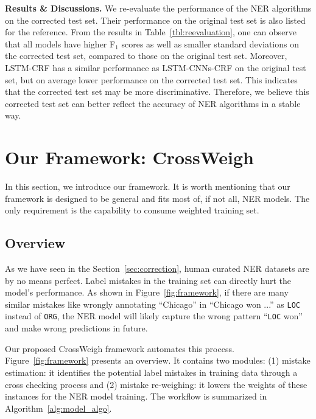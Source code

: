\documentclass[11pt,a4paper]{article}
\newcommand{\our}{\mbox{\sf CrossWeigh}\xspace}
\newcommand{\smallsection}[1]{{\noindent\textbf{#1.}}}
\begin{document}
%
         
        \smallsection{Results \& Discussions}
            We re-evaluate the performance of the NER algorithms on the corrected test set.
            Their performance on the original test set is also listed for the reference.
            From the results in Table~\ref{tbl:reevaluation}, one can observe that all models have higher F$_1$ scores as well as smaller standard deviations on the corrected test set, compared to those on the original test set.
            Moreover, LSTM-CRF has a similar performance as LSTM-CNNs-CRF on the original test set, but on average lower performance on the corrected test set. This indicates that the corrected test set may be more discriminative.
            Therefore, we believe this corrected test set can better reflect the accuracy of NER algorithms in a stable way.


            
%
 \section{Our Framework: CrossWeigh}\label{sec:crossweigh}
    In this section, we introduce our framework.
    It is worth mentioning that our framework is designed to be general and fits most of, if not all, NER models.
    The only requirement is the capability to consume weighted training set.
    
    \subsection{Overview}
    
        As we have seen in the Section~\ref{sec:correction}, human curated NER datasets are by no means perfect.
        Label mistakes in the training set can directly hurt the model's performance. 
        As shown in Figure~\ref{fig:framework}, if there are many similar mistakes like wrongly annotating ``Chicago'' in ``Chicago won ...'' as \texttt{LOC} instead of \texttt{ORG}, the NER model will likely capture the wrong pattern ``\texttt{LOC} won'' and make wrong predictions in future.
        


        Our proposed \our framework automates this process.
        Figure~\ref{fig:framework} presents an overview.
        It contains two modules: (1) mistake estimation: it identifies the potential label mistakes in training data through a cross checking process and (2) mistake re-weighing: it lowers the weights of these instances for the NER model training. The workflow is summarized in Algorithm~\ref{alg:model_algo}.
        
\end{document}
